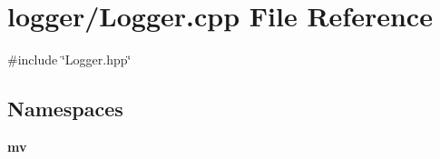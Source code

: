 \section{logger/\+Logger.cpp File Reference}
\label{_logger_8cpp}
{\ttfamily \#include \char`\"{}Logger.\+hpp\char`\"{}}\newline
\subsection*{Namespaces}
\begin{DoxyCompactItemize}
\item 
 \textbf{ mv}
\end{DoxyCompactItemize}
